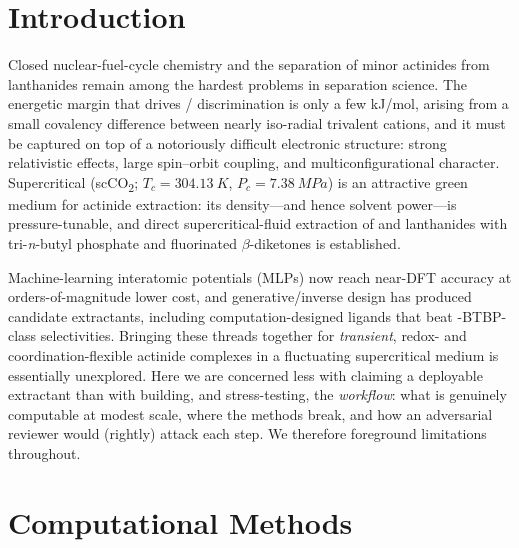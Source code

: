 \documentclass[journal=jcisd8,manuscript=article]{achemso}
\begin{document}
\section{Introduction}
Closed nuclear-fuel-cycle chemistry and the separation of minor actinides from
lanthanides remain among the hardest problems in separation science. The
energetic margin that drives / discrimination is only a few
\si{kJ/mol}, arising from a small covalency difference between nearly
iso-radial trivalent cations, and it must be captured on top of a notoriously
difficult electronic structure: strong relativistic effects, large spin--orbit
coupling, and multiconfigurational  character.\cite{Kolarik2008,Panak2013}
Supercritical  (scCO\textsubscript{2}; \(T_c=\SI{304.13}{K}\),
\(P_c=\SI{7.38}{MPa}\)) is an attractive green medium for actinide extraction:
its density---and hence solvent power---is pressure-tunable, and direct
supercritical-fluid extraction of  and lanthanides with
tri-\textit{n}-butyl phosphate and fluorinated \(\beta\)-diketones is
established.\cite{Wai,SpanWagner}

Machine-learning interatomic potentials (MLPs) now reach near-DFT accuracy at
orders-of-magnitude lower cost,\cite{Behler2021,Batatia2022,Batzner2022} and
generative/inverse design has produced candidate extractants, including
computation-designed ligands that beat -BTBP-class
selectivities.\cite{JacsAu2022,JacsAu2024} Bringing these threads together for
\emph{transient}, redox- and coordination-flexible actinide complexes in a
fluctuating supercritical medium is essentially unexplored. Here we are concerned
less with claiming a deployable extractant than with building, and stress-testing,
the \emph{workflow}: what is genuinely computable at modest scale, where the
methods break, and how an adversarial reviewer would (rightly) attack each step.
We therefore foreground limitations throughout.

\section{Computational Methods}
\end{document}
